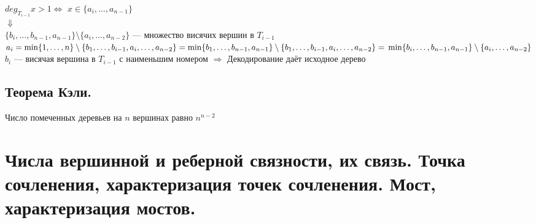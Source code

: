 \documentclass[12pt]{article}
\begin{document}
			$deg_{T_{i-1}}x > 1 \Leftrightarrow$ $x \in\{a_i,\dotsc,a_{n-1}\}$\\
			$\Downarrow$\\
			$\{b_i,\dotsc,b_{n-1},a_{n-1}\}\setminus\{a_i,\dotsc,a_{n-2}\}$ — множество висячих вершин в $T_{i-1}$\\
			$a_i = \min\{1,\dotsc,n\}\setminus\{b_1,\dotsc,b_{i-1},a_i,\dotsc,a_{n-2}\} = \min\{b_1,\dotsc,b_{n-1},a_{n-1}\}\setminus\{b_1,\dotsc,b_{i-1},a_i,\dots,a_{n-2}\} =\\ \min\{b_i,\dotsc,b_{n-1},a_{n-1}\}\setminus\{a_i,\dotsc,a_{n-2}\}$\\
			$b_i$ — висячая вершина в $T_{i-1}$ с наименьшим номером $\Rightarrow$ Декодирование даёт исходное дерево\\
		\qedsymbol
	\subsection{Теорема Кэли.}
		Число помеченных деревьев на $n$ вершинах равно $n^{n-2}$

\section{Числа вершинной и реберной связности, их связь. Точка сочленения, характеризация точек сочленения. Мост, характеризация мостов.}
\end{document}
